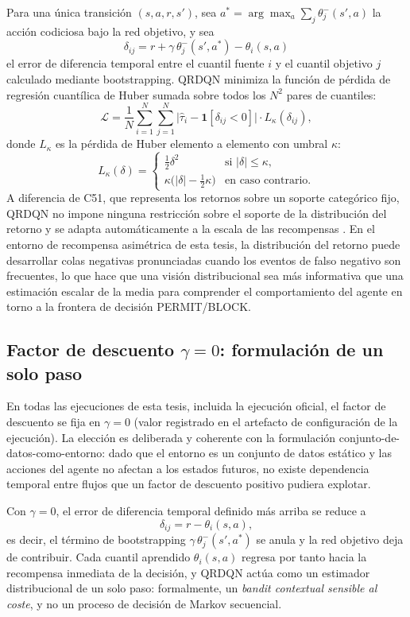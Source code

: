 Para una única transición $(s, a, r, s')$, sea $a^* = \arg\max_a \sum_j \theta_j^-(s', a)$ la acción codiciosa bajo la red objetivo, y sea
\[
    \delta_{ij} = r + \gamma\,\theta_j^-(s', a^*) - \theta_i(s, a)
\]
el error de diferencia temporal entre el cuantil fuente $i$ y el cuantil objetivo $j$ calculado mediante bootstrapping. QRDQN minimiza la función de pérdida de regresión cuantílica de Huber sumada sobre todos los $N^2$ pares de cuantiles:
\[
    \mathcal{L} = \frac{1}{N}\sum_{i=1}^{N}\sum_{j=1}^{N}
        \bigl|\hat{\tau}_i - \mathbf{1}[\delta_{ij} < 0]\bigr|\cdot L_\kappa(\delta_{ij}),
\]
donde $L_\kappa$ es la pérdida de Huber elemento a elemento con umbral $\kappa$:
\[
    L_\kappa(\delta) = \begin{cases} \tfrac{1}{2}\delta^2 & \text{si } |\delta| \leq \kappa, \\ \kappa\bigl(|\delta| - \tfrac{1}{2}\kappa\bigr) & \text{en caso contrario.}\end{cases}
\]
A diferencia de C51, que representa los retornos sobre un soporte categórico fijo, QRDQN no impone ninguna restricción sobre el soporte de la distribución del retorno y se adapta automáticamente a la escala de las recompensas \parencite{Bellemare2017DistributionalRL}. En el entorno de recompensa asimétrica de esta tesis, la distribución del retorno puede desarrollar colas negativas pronunciadas cuando los eventos de falso negativo son frecuentes, lo que hace que una visión distribucional sea más informativa que una estimación escalar de la media para comprender el comportamiento del agente en torno a la frontera de decisión PERMIT/BLOCK.

\subsection{Factor de descuento $\gamma = 0$: formulación de un solo paso}
En todas las ejecuciones de esta tesis, incluida la ejecución oficial, el factor de descuento se fija en $\gamma = 0$ (valor registrado en el artefacto de configuración de la ejecución). La elección es deliberada y coherente con la formulación conjunto-de-datos-como-entorno: dado que el entorno es un conjunto de datos estático y las acciones del agente no afectan a los estados futuros, no existe dependencia temporal entre flujos que un factor de descuento positivo pudiera explotar.

Con $\gamma = 0$, el error de diferencia temporal definido más arriba se reduce a
\[
    \delta_{ij} = r - \theta_i(s, a),
\]
es decir, el término de bootstrapping $\gamma\,\theta_j^-(s', a^*)$ se anula y la red objetivo deja de contribuir. Cada cuantil aprendido $\theta_i(s,a)$ regresa por tanto hacia la recompensa inmediata de la decisión, y QRDQN actúa como un estimador distribucional de un solo paso: formalmente, un \emph{bandit contextual sensible al coste}, y no un proceso de decisión de Markov secuencial.

